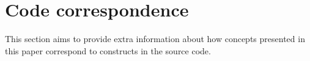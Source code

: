 \section{Code correspondence}
\label{app:correspondence}

This section aims to provide extra information about how concepts presented in this paper correspond to constructs in the source code.


